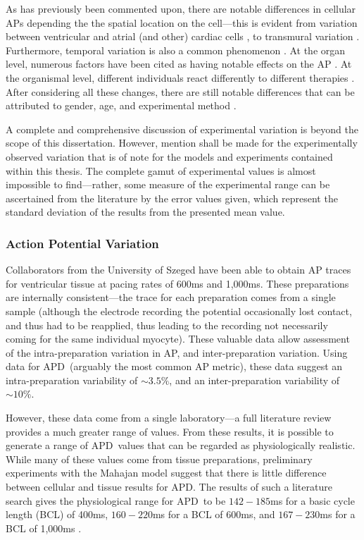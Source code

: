 \documentclass[../thesis-main.tex]{subfiles}
\begin{document}
 As has previously been commented upon, there are notable differences in cellular APs depending the the spatial location on the cell---this is evident from variation between ventricular and atrial (and other) cardiac cells \citep{Carmeliet2002}, to transmural variation \citep{Antzelevitch1991}. Furthermore, temporal variation is also a common phenomenon \citep{Walmsley2010}. At the organ level, numerous factors have been cited as having notable effects on the AP \citep{Taylor1997}. At the organismal level, different individuals react differently to different therapies \citep{Kannankeril2010}. After considering all these changes, there are still notable differences that can be attributed to gender, age, and experimental method \citep{Yang2012, Kurokawa2012}.
 
 A complete and comprehensive discussion of experimental variation is beyond the scope of this dissertation. However, mention shall be made for the experimentally observed variation that is of note for the models and experiments contained within this thesis. The complete gamut of experimental values is almost impossible to find---rather, some measure of the experimental range can be ascertained from the literature by the error values given, which represent the standard deviation of the results from the presented mean value.
 
 \subsubsection{Action Potential Variation}
 \label{subsubsec:ap-variation}
 Collaborators from the University of Szeged have been able to obtain AP traces for ventricular tissue at pacing rates of 600ms and 1,000ms. These preparations are internally consistent---the trace for each preparation comes from a single sample (although the electrode recording the potential occasionally lost contact, and thus had to be reapplied, thus leading to the recording not necessarily coming for the same individual myocyte). These valuable data allow assessment of the intra-preparation variation in AP, and inter-preparation variation. Using data for APD~(arguably the most common AP metric), these data suggest an intra-preparation variability of $\sim3.5\%$, and an inter-preparation variability of $\sim10\%$.
 
 However, these data come from a single laboratory---a full literature review provides a much greater range of values. From these results, it is possible to generate a range of APD~values that can be regarded as physiologically realistic. While many of these values come from tissue preparations, preliminary experiments with the Mahajan model suggest that there is little difference between cellular and tissue results for APD. The results of such a literature search gives the physiological range for APD~to be $142-185$ms for a basic cycle length (BCL) of 400ms, $160-220$ms for a BCL of 600ms, and $167-230$ms for a BCL of 1,000ms \citep{Biagetti2006, Szigligeti1996, Yan2001, Jung2011, Goldhaber2005, Wu2011, Chen2006, Kirchhof2003, Eckardt1998, Zabel1997, Zabel1997a, Kurz1993, McIntosh2000}.
 
\end{document}
